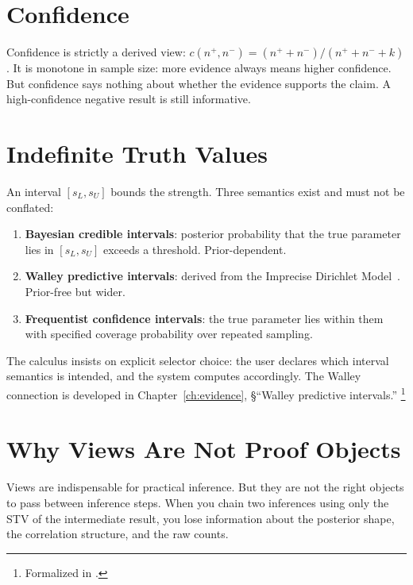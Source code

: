 \documentclass[11pt,openany]{report}
\begin{document}
\section{Confidence}

Confidence is strictly a derived view:
$c(n^+, n^-) = (n^+ + n^-) / (n^+ + n^- + k)$.  It is monotone in
sample size: more evidence always means higher confidence.  But
confidence says nothing about whether the evidence supports the claim.
A high-confidence negative result is still informative.


\section{Indefinite Truth Values}

An interval $[s_L, s_U]$ bounds the strength.  Three semantics
exist and must not be conflated:

\begin{enumerate}
\item \textbf{Bayesian credible intervals}: posterior probability
  that the true parameter lies in $[s_L, s_U]$ exceeds a threshold.
  Prior-dependent.

\item \textbf{Walley predictive intervals}: derived from the
  Imprecise Dirichlet Model~\cite{Walley1996BagOfMarbles}.
  Prior-free but wider.

\item \textbf{Frequentist confidence intervals}: the true parameter
  lies within them with specified coverage probability over repeated
  sampling.
\end{enumerate}

\noindent
The calculus insists on explicit selector choice: the user declares
which interval semantics is intended, and the system computes
accordingly.  The Walley connection is developed in
Chapter~\ref{ch:evidence}, \S``Walley predictive intervals.''%
\footnote{Formalized in
.}


\section{Why Views Are Not Proof Objects}
\label{sec:views-not-proof}

Views are indispensable for practical inference.  But they are not
the right objects to pass between inference steps.  When you chain
two inferences using only the STV of the intermediate result, you
lose information about the posterior shape, the correlation structure,
and the raw counts.
\end{document}
